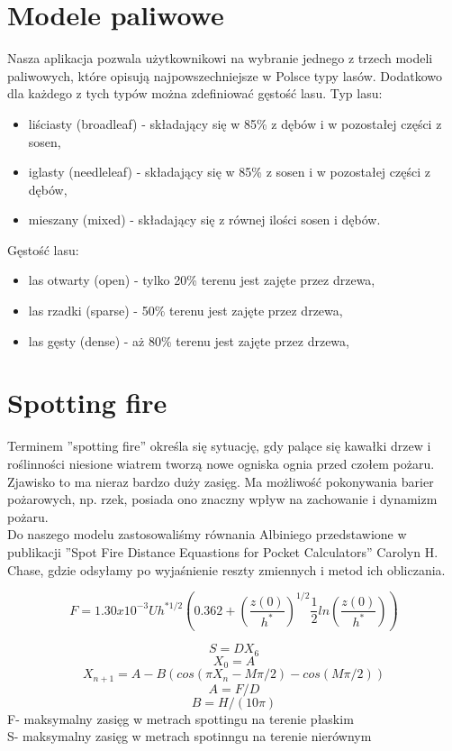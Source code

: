 \documentclass[a4paper, 11pt]{article}
\begin{document}
	\section*{Modele paliwowe}
	\indent	
	
	Nasza aplikacja pozwala użytkownikowi na wybranie jednego z trzech modeli paliwowych, które opisują najpowszechniejsze w Polsce typy lasów. Dodatkowo dla każdego z tych typów można zdefiniować gęstość lasu.
	Typ lasu:
	\begin{itemize}
		\item liściasty (broadleaf) - składający się w 85\% z dębów i w pozostałej części z sosen,
		\item iglasty (needleleaf) - składający się w 85\% z sosen i w pozostałej części z dębów,
		\item mieszany (mixed) - składający się z równej ilości sosen i dębów.
		
	\end{itemize}
	Gęstość lasu:
	\begin{itemize}
		\item las otwarty (open) - tylko 20\% terenu jest zajęte przez drzewa,
		\item las rzadki (sparse) - 50\% terenu jest zajęte przez drzewa,
		\item las gęsty (dense) - aż 80\% terenu jest zajęte przez drzewa,
		
	\end{itemize}
	\section*{Spotting fire}
	\indent
	Terminem ''spotting fire'' określa się sytuację, gdy palące się kawałki drzew i roślinności niesione wiatrem tworzą nowe ogniska ognia przed czołem pożaru. Zjawisko to ma nieraz bardzo duży zasięg.  Ma możliwość pokonywania barier pożarowych, np. rzek, posiada ono znaczny wpływ na zachowanie i dynamizm pożaru.\\
	
	Do naszego modelu zastosowaliśmy równania Albiniego przedstawione w publikacji ''Spot Fire Distance Equastions for Pocket Calculators'' Carolyn H. Chase, gdzie odsyłamy po wyjaśnienie reszty zmiennych i metod ich obliczania.
		
		$$F=1.30x10^{-3}Uh^{*1/2}\left( 0.362+\left(\frac{z(0)}{h^{*}}\right)^{1/2}\frac{1}{2}ln\left(\frac{z(0)}{h^{*}}\right) \right)$$
		
		$$S=DX_6$$
		$$X_0=A$$
	$$	X_{n+1}=A-B(cos(\pi X_n-M\pi/2)-cos(M\pi/2))$$
	$$	A=F/D$$
	$$	B=H/(10\pi)		$$
	F-  maksymalny zasięg w metrach spottingu na terenie płaskim\\
	S-  maksymalny zasięg w metrach spotinngu na terenie nierównym\\	
	
\end{document}
